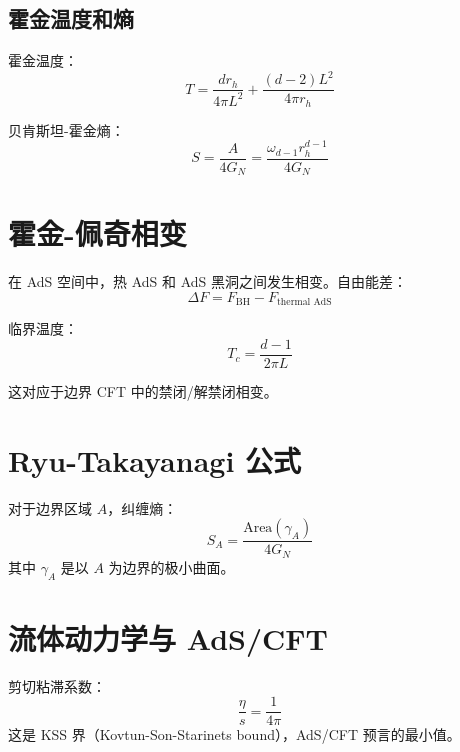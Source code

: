 \documentclass[12pt,a4paper]{ctexart}
\begin{document}
\subsection{霍金温度和熵}

霍金温度：
\begin{equation}
    T = \frac{d r_h}{4\pi L^2} + \frac{(d-2) L^2}{4\pi r_h}
\end{equation}

贝肯斯坦-霍金熵：
\begin{equation}
    S = \frac{A}{4G_N} = \frac{\omega_{d-1} r_h^{d-1}}{4G_N}
\end{equation}

\section{霍金-佩奇相变}

在 AdS 空间中，热 AdS 和 AdS 黑洞之间发生相变。自由能差：
\begin{equation}
    \Delta F = F_{\text{BH}} - F_{\text{thermal AdS}}
\end{equation}

临界温度：
\begin{equation}
    T_c = \frac{d-1}{2\pi L}
\end{equation}

这对应于边界 CFT 中的禁闭/解禁闭相变。

\section{Ryu-Takayanagi 公式}

对于边界区域 $A$，纠缠熵：
\begin{equation}
    S_A = \frac{\text{Area}(\gamma_A)}{4G_N}
\end{equation}
其中 $\gamma_A$ 是以 $A$ 为边界的极小曲面。

\section{流体动力学与 AdS/CFT}

剪切粘滞系数：
\begin{equation}
    \frac{\eta}{s} = \frac{1}{4\pi}
\end{equation}
这是 KSS 界（Kovtun-Son-Starinets bound），AdS/CFT 预言的最小值。
\end{document}
